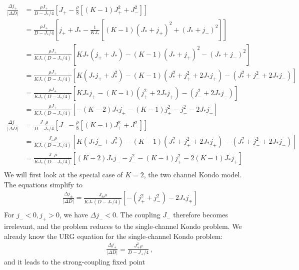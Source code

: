 \documentclass{revtex4-2}
\numberwithin{equation}{section}
\begin{document}
\begin{equation}\begin{aligned}
	\frac{\Delta j_+}{|\Delta D|} &= \frac{\rho J_+}{D - J_*/4}\left[J_+ - \frac{\rho}{8}\left[(K-1)J_+^2 + J_-^2\right]\right]\\
				      &= \frac{\rho J_+}{D - J_*/4}\left[j_+ + J_*- \frac{1}{K J_*}\left[(K-1)\left(J_* + j_+\right)^2 + \left(J_* + j_-\right)^2\right]\right]\\
				      &= \frac{\rho J_+}{K J_*\left(D - J_*/4\right)}\left[KJ_*\left(j_+ + J_*\right) - (K-1)\left(J_* + j_+\right)^2 - \left(J_* + j_-\right)^2\right]\\
				      &= \frac{\rho J_+}{K J_*\left(D - J_*/4\right)}\left[K\left(J_*j_+ + J_*^2\right) - (K-1)\left(J_*^2 + j_+^2 + 2J_* j_+\right) - \left(J_*^2 + j_-^2 + 2J_* j_-\right)\right]\\
				      &= \frac{\rho J_+}{K J_*\left(D - J_*/4\right)}\left[KJ_*j_+ - (K-1)\left(j_+^2 + 2J_* j_+\right) - \left(j_-^2 + 2J_* j_-\right)\right]\\
				      &= \frac{\rho J_+}{K J_*\left(D - J_*/4\right)}\left[-\left(K - 2\right)J_*j_+ - (K-1)j_+^2 - j_-^2 - 2J_* j_-\right]\\
	\frac{\Delta j_-}{|\Delta D|} &= \frac{J_- \rho}{D - J_*/4}\left[J_- - \frac{\rho}{8}\left[(K-1)J_+^2 + J_-^2\right]\right]\\
				      &= \frac{J_- \rho}{K J_*\left(D - J_*/4\right)}\left[K\left(J_*j_- + J_*^2\right) - (K-1)\left(J_*^2 + j_+^2 + 2J_* j_+\right) - \left(J_*^2 + j_-^2 + 2J_* j_-\right)\right]\\
				      &= \frac{J_- \rho}{K J_*\left(D - J_*/4\right)}\left[\left(K - 2\right)J_*j_-  - j_-^2 - (K-1)j_+^2 - 2(K-1)J_* j_+\right]\\
\end{aligned}\end{equation}
We will first look at the special case of \(K=2\), the two channel Kondo model. The equations simplify to
\begin{equation}\begin{aligned}
	\frac{\Delta j_\pm}{|\Delta D|} = \frac{J_\pm \rho}{K J_*\left(D - J_*/4\right)}\left[- \left(j_+^2 + j_-^2\right) - 2J_* j_\mp\right]\\
\end{aligned}\end{equation}
For \(j_- < 0, j_+ > 0\), we have \(\Delta j_- < 0\). The coupling \(J_-\) therefore becomes irrelevant, and the problem reduces to the single-channel Kondo problem. We already know the URG equation for the single-channel Kondo problem:
\begin{equation}\begin{aligned}
	\frac{\Delta j_+}{|\Delta D|} = \frac{J_+^2 \rho}{D - J_+/4}~,
\end{aligned}\end{equation}
and it leads to the strong-coupling fixed point
\end{document}
